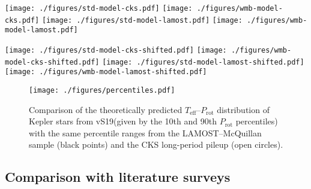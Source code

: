 \documentclass[trackchanges,twocolumn]{aastex631}
\newcommand{\rocrit}{$\mathrm{Ro_{crit}}$\xspace}
\newcommand{\rosun}{$\mathrm{Ro_{\odot}}$\xspace}
\newcommand{\lamostmcq}{LAMOST--McQuillan\xspace}
\newcommand{\jvs}{vS19\xspace}
\newcommand{\teff}{\ensuremath{T_{\mathrm{eff}}}\xspace}
\newcommand{\logg}{\ensuremath{\log g}\xspace}
\newcommand{\prot}{\ensuremath{P_\mathrm{rot}}\xspace}
\begin{document}
\begin{figure*}
    \centering 
    \texttt{[image: ./figures/std-model-cks.pdf]}
    \texttt{[image: ./figures/wmb-model-cks.pdf]}
    \texttt{[image: ./figures/std-model-lamost.pdf]}
    \texttt{[image: ./figures/wmb-model-lamost.pdf]}
    \caption{The \teff-\prot plane for the CKS sample (top panels) and LAMOST sample (bottom panels) in comparison to the standard and WMB models (2-d histograms) presented in \jvs. Shown here are stars with \logg~$>$~4.1. Rotation periods for the CKS sample here are sourced from the \citet{David2021} compilation. The black symbol in each panel indicates the position of the Sun.}
    \label{fig:models}
\end{figure*}


\begin{figure*}
    \centering 
    \texttt{[image: ./figures/std-model-cks-shifted.pdf]}
    \texttt{[image: ./figures/wmb-model-cks-shifted.pdf]}
    \texttt{[image: ./figures/std-model-lamost-shifted.pdf]}
    \texttt{[image: ./figures/wmb-model-lamost-shifted.pdf]}
    \caption{Same as Figure~\ref{fig:models} with constant \teff offsets applied to the data. Shifts of +111~K and +116~K are applied to the CKS and LAMOST \teff, respectively. The \teff shifts originate from a least-squares fit of a \rocrit~=~\rosun curve (with a \teff offset) to the long-period pileup (as described in \S\ref{subsec:rossby}).}
    \label{fig:shifted}
\end{figure*}


\begin{figure}
    \centering
    \texttt{[image: ./figures/percentiles.pdf]}
    \caption{Comparison of the theoretically predicted \teff--\prot distribution of Kepler stars from \jvs (given by the 10th and 90th \prot percentiles) with the same percentile ranges from the \lamostmcq sample (black points) and the CKS long-period pileup (open circles).}
    \label{fig:percentiles}
\end{figure}

\subsection{Comparison with literature surveys}
\label{subsec:asteroseismic}
\end{document}
